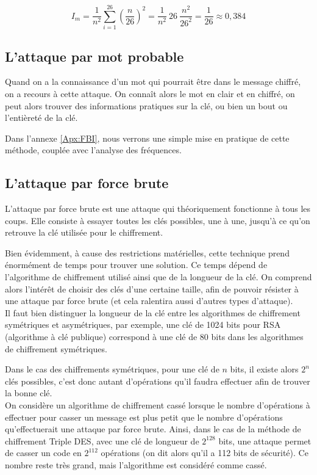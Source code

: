 \[I_m = \dfrac{1}{n^2} \sum_{i = 1}^{26} \left(\dfrac{n}{26}\right)^2 =
\dfrac{1}{n^2} ~26~ \dfrac{n^2}{26^2} = \dfrac{1}{26} \approx
0,384\] 

\subsection{L'attaque par mot probable\label{sec:MotProbable}}
Quand on a la connaissance d'un mot qui pourrait être dans le
message chiffré, on a recours à cette attaque. On connaît alors le
mot en clair et en chiffré, on peut alors trouver des informations
pratiques sur la clé, ou bien un bout ou l'entièreté de la clé.

Dans l'annexe \ref{Apx:FBI}, nous verrons une simple mise en pratique
de cette méthode, couplée avec l'analyse des fréquences.

\subsection{L'attaque par force brute}
L'attaque par force brute est une attaque qui théoriquement
fonctionne à tous les coups. Elle consiste à essayer toutes les
clés possibles, une à une, jusqu'à ce qu'on retrouve
la clé utilisée pour le chiffrement.

Bien évidemment, à cause des restrictions matérielles, cette
technique prend énormément de temps pour trouver une solution. Ce
temps dépend de l'algorithme de chiffrement utilisé ainsi que de
la longueur de la clé. On comprend alors l'intérêt de choisir des
clés d'une certaine taille, afin de pouvoir résister à une attaque
par force brute (et cela ralentira aussi d'autres types
d'attaque).
\\

Il faut bien distinguer la longueur de la clé entre les
algorithmes de chiffrement symétriques et asymétriques, par
exemple, une clé de 1024 bits pour RSA (algorithme à clé
publique) correspond à une clé de 80 bits dans les algorithmes de
chiffrement symétriques. 

Dans le cas des chiffrements symétriques, pour une clé de $n$
bits, il existe alors $2^n$ clés possibles, c'est donc autant
d'opérations qu'il faudra effectuer afin de trouver la bonne clé. 
\\

On considère un algorithme de chiffrement cassé lorsque le nombre
d'opérations à effectuer pour casser un message est plus
petit que le nombre d'opérations qu'effectuerait une attaque par
force brute. Ainsi, dans le cas de la méthode de chiffrement
Triple DES, avec une clé de longueur de $2^{128}$ bits, une
attaque permet de casser un code en $2^{112}$ opérations (on dit
alors qu'il a 112 bits de sécurité). Ce nombre
reste très grand, mais l'algorithme est considéré comme cassé.
\\

